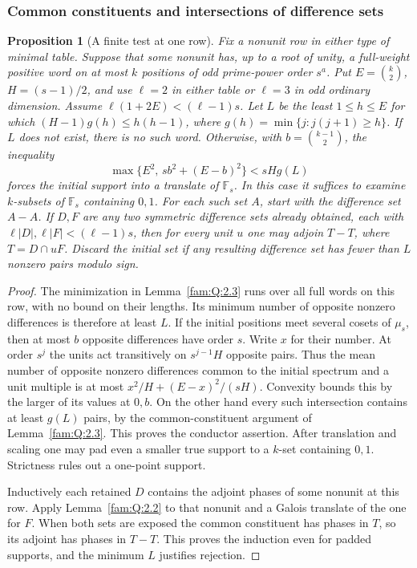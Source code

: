 \documentclass[11pt,a4paper]{article}
\numberwithin{equation}{section}
\newtheorem{proposition}[theorem]{Proposition}
\theoremstyle{remark}
\begin{document}
\subsubsection{Common constituents and intersections of difference sets}
\begin{proposition}[A finite test at one row]\label{fam:A:exposed}
Fix a nonunit row in either type of minimal table. Suppose that some
nonunit has, up to a root of unity, a full-weight positive word on at
most $k$ positions of odd prime-power order $s^a$. Put
$E=\binom{k}{2}$, $H=(s-1)/2$, and use $\ell=2$ in either table
or $\ell=3$ in odd ordinary dimension. Assume
$\ell(1+2E)<(\ell-1)s$. Let $L$ be the least $1\le h\le E$ for which
$(H-1)g(h)\le h(h-1)$, where $g(h)=\min\{j:j(j+1)\ge h\}$.
If $L$ does not exist, there is no such word. Otherwise, with
$b=\binom{k-1}{2}$, the inequality
\[
   \max\{E^2,\,s b^2+(E-b)^2\}<sH g(L)
\]
forces the initial support into a translate of $\mathbb F_s$.
In this case it suffices to examine $k$-subsets of $\mathbb F_s$
containing $0,1$. For each such set $A$, start with the difference
set $A-A$. If $D,F$ are any two symmetric difference sets already
obtained, each with $\ell|D|,\ell|F|<(\ell-1)s$, then for every unit
$u$ one may adjoin $T-T$, where $T=D\cap uF$. Discard the initial
set if any resulting difference set has fewer than $L$ nonzero pairs
modulo sign.
\end{proposition}
\begin{proof}
The minimization in Lemma~\ref{fam:Q:2.3} runs over all full words on
this row, with no bound on their lengths. Its minimum number of
opposite nonzero differences is therefore at least $L$. If the initial
positions meet several cosets of $\mu_s$, then at most $b$ opposite
differences have order $s$. Write $x$ for their number. At order $s^j$
the units act transitively on $s^{j-1}H$ opposite pairs. Thus the mean
number of opposite nonzero differences common to the initial spectrum
and a unit multiple is at most
$x^2/H+(E-x)^2/(sH)$. Convexity bounds this by the larger of its
values at $0,b$. On the other hand every such intersection contains at
least $g(L)$ pairs, by the common-constituent argument of
Lemma~\ref{fam:Q:2.3}. This proves the conductor assertion.
After translation and scaling one may pad even a smaller true support
to a $k$-set containing $0,1$. Strictness rules out a one-point support.

Inductively each retained $D$ contains the adjoint phases of some
nonunit at this row. Apply Lemma~\ref{fam:Q:2.2} to that nonunit
and a Galois translate of the one for $F$. When both sets are exposed
the common constituent has phases in $T$, so its adjoint has phases
in $T-T$. This proves the induction even for padded supports, and
the minimum $L$ justifies rejection.
\end{proof}
\end{document}
